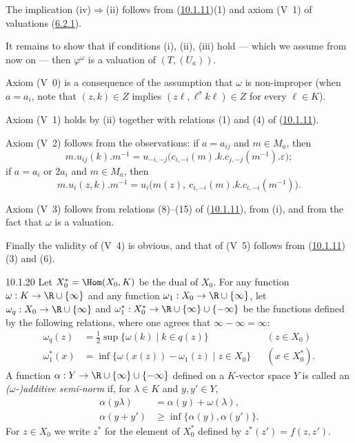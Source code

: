 \documentclass[12pt,a4paper,oneside,english]{smfart}
\makeatletter
\newcommand{\btanchor}[1]{\leavevmode\Hy@raisedlink{\hypertarget{bt:#1}{}}}
\newcommand{\btref}[1]{\hyperlink{bt:#1}{#1}}
\theoremstyle{definition}
\theoremstyle{bt}
\makeatother
\begin{document}
The implication (iv)$\Rightarrow$(ii) follows from (\btref{10.1.11})(1) and axiom (V~1)
of valuations (\btref{6.2.1}).

It remains to show that if conditions (i), (ii), (iii) hold --- which we assume
from now on --- then $\varphi^{\omega}$ is a valuation of $(T,(U_a))$.

Axiom (V~0) is a consequence of the assumption that $\omega$ is non-improper
(when $a=a_i$, note that $(z,k)\in Z$ implies
$(z\ell,\ell^{\sigma}k\ell)\in Z$ for every $\ell\in K$).

Axiom (V~1) holds by (ii) together with relations (1) and (4) of (\btref{10.1.11}).

Axiom (V~2) follows from the observations: if $a=a_{ij}$ and $m\in M_a$, then
\[
m.u_{ij}(k).m^{-1}  =u_{-i,-j}\bigl(c_{i,-i}(m).k.c_{j,-j}(m^{-1}).\varepsilon\bigr);
\]
if $a=a_i$ or $2a_i$ and $m\in M_a$, then
\[
m.u_i(z,k).m^{-1}  =u_i\bigl(m(z),\ c_{i,-i}(m).k.c_{i,-i}(m^{-1})\bigr).
\]

Axiom (V~3) follows from relations (8)--(15) of (\btref{10.1.11}), from (i), and from
the fact that $\omega$ is a valuation.

Finally the validity of (V~4) is obvious, and that of (V~5) follows from
(\btref{10.1.11})(3) and (6).

\num{10.1.20}\btanchor{10.1.20} Let $X_0^{*}=\Hom(X_0,K)$ be the dual of $X_0$. For any function
$\omega:K\to\R\cup\{\infty\}$ and any function
$\omega_1:X_0\to\R\cup\{\infty\}$, let
$\omega_q:X_0\to\R\cup\{\infty\}$ and
$\omega_1^{*}:X_0^{*}\to\R\cup\{\infty\}\cup\{-\infty\}$ be the functions
defined by the following relations, where one agrees that
$\infty-\infty=\infty$:
\begin{align*}
\omega_q(z)&=\tfrac12\sup\{\omega(k)\mid k\in q(z)\} && (z\in X_0)\\
\omega_1^{*}(x)&=\inf\{\omega(x(z))-\omega_1(z)\mid z\in X_0\} && (x\in X_0^{*}).
\end{align*}
A function $\alpha:Y\to\R\cup\{\infty\}\cup\{-\infty\}$ defined on a
$K$-vector space $Y$ is called an \emph{($\omega$-)additive semi-norm} if, for
$\lambda\in K$ and $y,y'\in Y$,
\begin{align}
\alpha(y\lambda)&=\alpha(y)+\omega(\lambda), \tag{1}\\
\alpha(y+y')&\ge\inf\{\alpha(y),\alpha(y')\}. \tag{2}
\end{align}
For $z\in X_0$ we write $z^{*}$ for the element of $X_0^{*}$ defined by
$z^{*}(z')=f(z,z')$.
\end{document}
